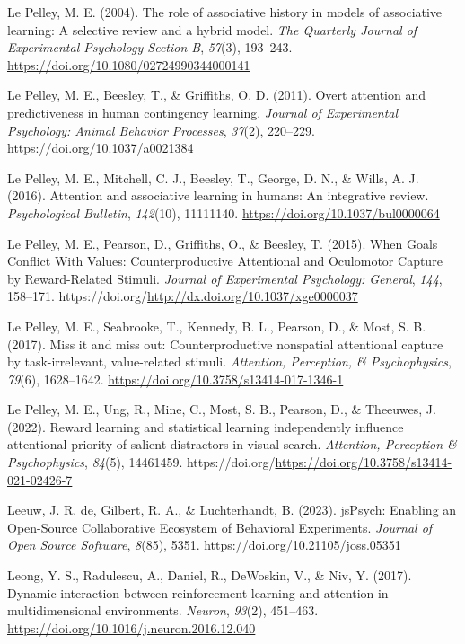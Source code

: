 \documentclass[
  man,
  floatsintext,
  longtable,
  nolmodern,
  notxfonts,
  notimes,
  mask,
  colorlinks=true,linkcolor=blue,citecolor=blue,urlcolor=blue]{apa7}
\newlength{\cslhangindent}
\newenvironment{CSLReferences}[2] %
 {\begin{list}{}{%
  \setlength{\itemindent}{0pt}
  \setlength{\leftmargin}{0pt}
  \setlength{\parsep}{0pt}
  \ifodd #1
   \setlength{\leftmargin}{\cslhangindent}
   \setlength{\itemindent}{-1\cslhangindent}
  \fi
  \setlength{\itemsep}{#2\baselineskip}}}
 {\end{list}}
\begin{document}
\begin{CSLReferences}{1}{0}
Le Pelley, M. E. (2004). The role of associative history in models of
associative learning: A selective review and a hybrid model. \emph{The
Quarterly Journal of Experimental Psychology Section B}, \emph{57}(3),
193--243. \url{https://doi.org/10.1080/02724990344000141}

Le Pelley, M. E., Beesley, T., \& Griffiths, O. D. (2011). Overt
attention and predictiveness in human contingency learning.
\emph{Journal of Experimental Psychology: Animal Behavior Processes},
\emph{37}(2), 220--229. \url{https://doi.org/10.1037/a0021384}

Le Pelley, M. E., Mitchell, C. J., Beesley, T., George, D. N., \& Wills,
A. J. (2016). Attention and associative learning in humans: An
integrative review. \emph{Psychological Bulletin}, \emph{142}(10),
11111140. \url{https://doi.org/10.1037/bul0000064}

Le Pelley, M. E., Pearson, D., Griffiths, O., \& Beesley, T. (2015).
When Goals Conflict With Values: Counterproductive Attentional and
Oculomotor Capture by Reward-Related Stimuli. \emph{Journal of
Experimental Psychology: General}, \emph{144}, 158--171.
https://doi.org/\url{http://dx.doi.org/10.1037/xge0000037}

Le Pelley, M. E., Seabrooke, T., Kennedy, B. L., Pearson, D., \& Most,
S. B. (2017). Miss it and miss out: Counterproductive nonspatial
attentional capture by task-irrelevant, value-related stimuli.
\emph{Attention, Perception, \& Psychophysics}, \emph{79}(6),
1628--1642. \url{https://doi.org/10.3758/s13414-017-1346-1}

Le Pelley, M. E., Ung, R., Mine, C., Most, S. B., Pearson, D., \&
Theeuwes, J. (2022). Reward learning and statistical learning
independently influence attentional priority of salient distractors in
visual search. \emph{Attention, Perception \& Psychophysics},
\emph{84}(5), 14461459.
https://doi.org/\url{https://doi.org/10.3758/s13414-021-02426-7}

Leeuw, J. R. de, Gilbert, R. A., \& Luchterhandt, B. (2023). jsPsych:
Enabling an Open-Source Collaborative Ecosystem of Behavioral
Experiments. \emph{Journal of Open Source Software}, \emph{8}(85), 5351.
\url{https://doi.org/10.21105/joss.05351}

Leong, Y. S., Radulescu, A., Daniel, R., DeWoskin, V., \& Niv, Y.
(2017). Dynamic interaction between reinforcement learning and attention
in multidimensional environments. \emph{Neuron}, \emph{93}(2), 451--463.
\url{https://doi.org/10.1016/j.neuron.2016.12.040}


\end{CSLReferences}
\end{document}
